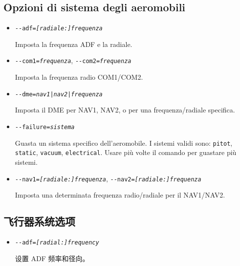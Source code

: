 \begin{itemize}
{  \subsection{Opzioni di sistema degli aeromobili}

  \begin{itemize}
  \item{\texttt{-$ $-adf={\it [radiale:]frequenza}}}

  Imposta la frequenza ADF e la radiale.

  \item{\texttt{-$ $-com1={\it frequenza}}, \texttt{-$ $-com2={\it frequenza}}}

  Imposta la frequenza radio COM1/COM2.

  \item{\texttt{-$ $-dme={\it {nav1|nav2|frequenza}}}}

  Imposta il DME per NAV1, NAV2, o per una frequenza/radiale specifica.

  \item{\texttt{-$ $-failure={\it sistema}}}

  Guasta un sistema specifico dell'aeromobile. I sistemi validi sono: \texttt{pitot}, \texttt{static},
  \texttt{vacuum}, \texttt{electrical}. Usare pi\`{u} volte il comando per guastare pi\`{u} sistemi.

  \item{\texttt{-$ $-nav1={\it [radiale:]frequenza}}, \texttt{-$ $-nav2={\it [radiale:]frequenza}}}

  Imposta una determinata frequenza radio/radiale per il NAV1/NAV2.

  \end{itemize}
}
\ifchinese
{
  \subsection{飞行器系统选项}
\begin{itemize}
  \item{\texttt{-$ $-adf={\it [radial:]frequency}}}
 
  设置 ADF 频率和径向。


\end{itemize}}
\end{itemize}

